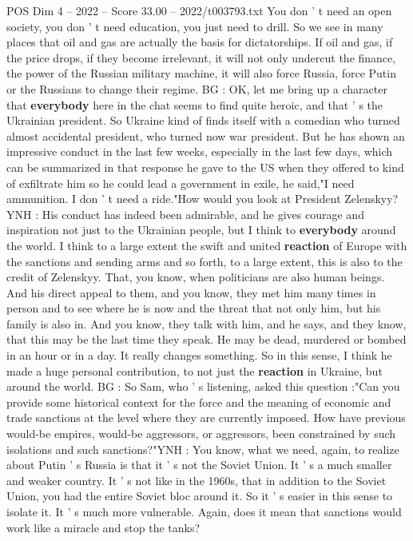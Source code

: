 \begin{textsample}{POS Dim 4 – 2022 – Score 33.00 – 2022/t003793.txt}
You don ' t need an open society, you don ' t need education, you just need to drill.
So we see in many places that oil and gas are actually the basis for dictatorships.
If oil and gas, if the price drops, if they become irrelevant, it will not only undercut the finance, the power of the Russian military machine, it will also force Russia, force Putin or the Russians to change their regime.
BG : OK, let me bring up a character that \textbf{everybody} here in the chat seems to find quite heroic, and that ' s the Ukrainian president.
So Ukraine kind of finds itself with a comedian who turned almost accidental president, who turned now war president.
But he has shown an impressive conduct in the last few weeks, especially in the last few days, which can be summarized in that response he gave to the US when they offered to kind of exfiltrate him so he could lead a government in exile, he said,"I need ammunition.
I don ' t need a ride."How would you look at President Zelenskyy?
YNH : His conduct has indeed been admirable, and he gives courage and inspiration not just to the Ukrainian people, but I think to \textbf{everybody} around the world.
I think to a large extent the swift and united \textbf{reaction} of Europe with the sanctions and sending arms and so forth, to a large extent, this is also to the credit of Zelenskyy.
That, you know, when politicians are also human beings.
And his direct appeal to them, and you know, they met him many times in person and to see where he is now and the threat that not only him, but his family is also in.
And you know, they talk with him, and he says, and they know, that this may be the last time they speak.
He may be dead, murdered or bombed in an hour or in a day.
It really changes something.
So in this sense, I think he made a huge personal contribution, to not just the \textbf{reaction} in Ukraine, but around the world.
BG : So Sam, who ' s listening, asked this question :"Can you provide some historical context for the force and the meaning of economic and trade sanctions at the level where they are currently imposed.
How have previous would-be empires, would-be aggressors, or aggressors, been constrained by such isolations and such sanctions?"YNH : You know, what we need, again, to realize about Putin ' s Russia is that it ' s not the Soviet Union.
It ' s a much smaller and weaker country.
It ' s not like in the 1960s, that in addition to the Soviet Union, you had the entire Soviet bloc around it.
So it ' s easier in this sense to isolate it.
It ' s much more vulnerable.
Again, does it mean that sanctions would work like a miracle and stop the tanks?

\end{textsample}
